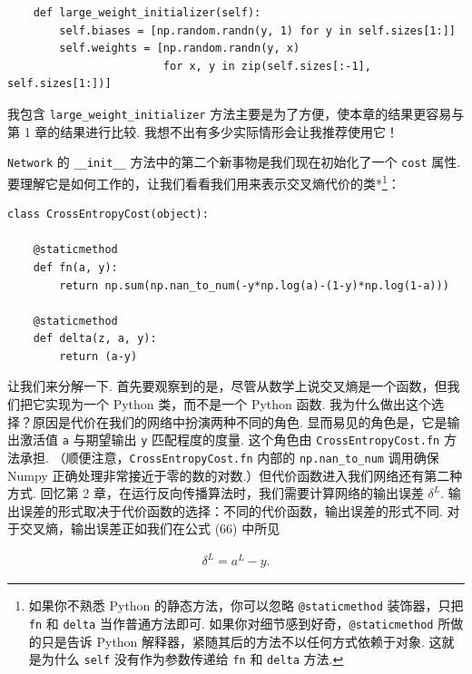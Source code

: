 \begin{lstlisting}
    def large_weight_initializer(self):
        self.biases = [np.random.randn(y, 1) for y in self.sizes[1:]]
        self.weights = [np.random.randn(y, x)
                        for x, y in zip(self.sizes[:-1], self.sizes[1:])]

\end{lstlisting}

我包含 \texttt{large\_\allowbreak{}weight\_\allowbreak{}initializer} 方法主要是为了方便，使本章的结果更容易与第 1 章的结果进行比较. 我想不出有多少实际情形会让我推荐使用它！

\texttt{Network} 的 \texttt{\_\allowbreak{}\_\allowbreak{}init\_\allowbreak{}\_\allowbreak{}} 方法中的第二个新事物是我们现在初始化了一个 \texttt{cost} 属性. 要理解它是如何工作的，让我们看看我们用来表示交叉熵代价的类*\footnote{如果你不熟悉 Python 的静态方法，你可以忽略 \texttt{@staticmethod} 装饰器，只把 \texttt{fn} 和 \texttt{delta} 当作普通方法即可. 如果你对细节感到好奇，\texttt{@staticmethod} 所做的只是告诉 Python 解释器，紧随其后的方法不以任何方式依赖于对象. 这就是为什么 \texttt{self} 没有作为参数传递给 \texttt{fn} 和 \texttt{delta} 方法.}：

\begin{lstlisting}
class CrossEntropyCost(object):

    @staticmethod
    def fn(a, y):
        return np.sum(np.nan_to_num(-y*np.log(a)-(1-y)*np.log(1-a)))

    @staticmethod
    def delta(z, a, y):
        return (a-y)

\end{lstlisting}

让我们来分解一下. 首先要观察到的是，尽管从数学上说交叉熵是一个函数，但我们把它实现为一个 Python 类，而不是一个 Python 函数. 我为什么做出这个选择？原因是代价在我们的网络中扮演两种不同的角色. 显而易见的角色是，它是输出激活值 \texttt{a} 与期望输出 \texttt{y} 匹配程度的度量. 这个角色由 \texttt{CrossEntropyCost.fn} 方法承担. （顺便注意，\texttt{CrossEntropyCost.fn} 内部的 \texttt{np.nan\_\allowbreak{}to\_\allowbreak{}num} 调用确保 Numpy 正确处理非常接近于零的数的对数.）但代价函数进入我们网络还有第二种方式. 回忆第 2 章，在运行反向传播算法时，我们需要计算网络的输出误差 $\delta^L$. 输出误差的形式取决于代价函数的选择：不同的代价函数，输出误差的形式不同. 对于交叉熵，输出误差正如我们在公式 (66) 中所见

\begin{align*}
\delta^L = a^L-y. \nonumber
\end{align*}

